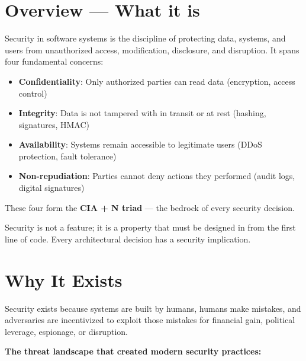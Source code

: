 \documentclass[11pt]{article}
\providecommand{\tightlist}{\setlength{\itemsep}{1pt}\setlength{\parskip}{0pt}}
\begin{document}
\makecoverpage

\thispagestyle{empty}
{\hypersetup{hidelinks}\tableofcontents}
\clearpage

\section{Overview --- What it is}\label{overview--what-it-is}

Security in software systems is the discipline of protecting data, systems, and users from unauthorized access, modification, disclosure, and disruption. It spans four fundamental concerns:

\begin{itemize}
\tightlist
\item
  \textbf{Confidentiality}: Only authorized parties can read data (encryption, access control)
\item
  \textbf{Integrity}: Data is not tampered with in transit or at rest (hashing, signatures, HMAC)
\item
  \textbf{Availability}: Systems remain accessible to legitimate users (DDoS protection, fault tolerance)
\item
  \textbf{Non-repudiation}: Parties cannot deny actions they performed (audit logs, digital signatures)
\end{itemize}

These four form the \textbf{CIA + N triad} --- the bedrock of every security decision.

Security is not a feature; it is a property that must be designed in from the first line of code. Every architectural decision has a security implication.

\section{Why It Exists}\label{why-it-exists}

Security exists because systems are built by humans, humans make mistakes, and adversaries are incentivized to exploit those mistakes for financial gain, political leverage, espionage, or disruption.

\textbf{The threat landscape that created modern security practices:}
\end{document}
